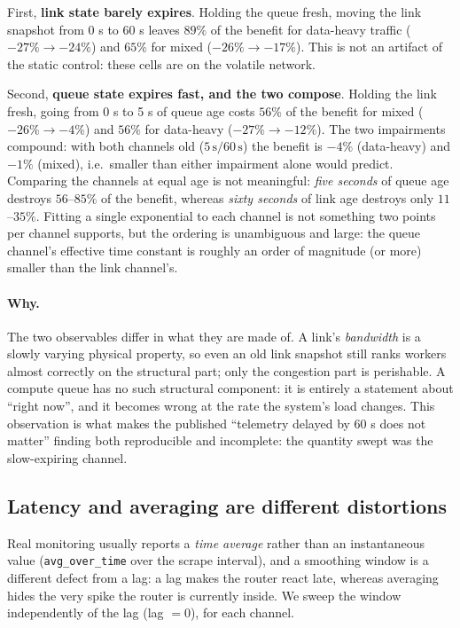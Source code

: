 First, \textbf{link state barely expires}. Holding the queue fresh, moving the link snapshot from
0 s to 60 s leaves $89\%$ of the benefit for data-heavy traffic
($-27\%\rightarrow-24\%$) and $65\%$ for mixed ($-26\%\rightarrow-17\%$). This is not an
artifact of the static control: these cells are on the volatile network.

Second, \textbf{queue state expires fast, and the two compose}. Holding the link fresh, going
from 0 s to 5 s of queue age costs $56\%$ of the benefit for mixed
($-26\%\rightarrow-4\%$) and $56\%$ for data-heavy ($-27\%\rightarrow-12\%$). The two impairments
compound: with both channels old ($5\,\text{s}/60\,\text{s}$) the benefit is $-4\%$ (data-heavy)
and $-1\%$ (mixed), i.e.~smaller than either impairment alone would predict.
Comparing the channels at equal age is not meaningful: \emph{five seconds} of queue age destroys
$56$--$85\%$ of the benefit, whereas \emph{sixty seconds} of link age destroys only
$11$--$35\%$. Fitting a single exponential to each channel is not something two points per
channel supports, but the ordering is unambiguous and large: the queue channel's effective time
constant is roughly an order of magnitude (or more) smaller than the link channel's.

\paragraph{Why.} The two observables differ in what they are made of. A link's \emph{bandwidth}
is a slowly varying physical property, so even an old link snapshot still ranks workers almost
correctly on the structural part; only the congestion part is perishable. A compute queue has no
such structural component: it is entirely a statement about ``right now'', and it becomes wrong
at the rate the system's load changes. This observation is what makes the published
``telemetry delayed by 60 s does not matter'' finding \cite{aegis} both reproducible
and incomplete: the quantity swept was the slow-expiring channel.

\subsection{Latency and averaging are different distortions}
Real monitoring usually reports a \emph{time average} rather than an instantaneous value
(\texttt{avg\_over\_time} over the scrape interval), and a smoothing window is a different defect
from a lag: a lag makes the router react late, whereas averaging hides the very spike the router
is currently inside. We sweep the window independently of the lag (lag $=0$), for each channel.

